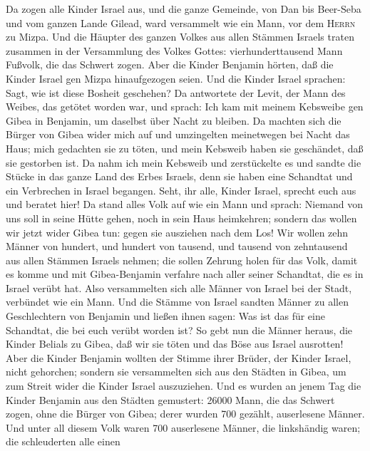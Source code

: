  Da zogen alle Kinder Israel aus, und die ganze Gemeinde,
von Dan bis Beer-Seba und vom ganzen Lande Gilead, ward versammelt wie
ein Mann, vor dem \textsc{Herrn} zu Mizpa.  Und die
Häupter des ganzen Volkes aus allen Stämmen Israels traten zusammen in
der Versammlung des Volkes Gottes: vierhunderttausend Mann Fußvolk, die
das Schwert zogen.  Aber die Kinder Benjamin hörten, daß
die Kinder Israel gen Mizpa hinaufgezogen seien. Und die Kinder Israel
sprachen: Sagt, wie ist diese Bosheit geschehen?  Da
antwortete der Levit, der Mann des Weibes, das getötet worden war, und
sprach: Ich kam mit meinem Kebsweibe gen Gibea in Benjamin, um daselbst
über Nacht zu bleiben.  Da machten sich die Bürger von
Gibea wider mich auf und umzingelten meinetwegen bei Nacht das Haus;
mich gedachten sie zu töten, und mein Kebsweib haben sie geschändet, daß
sie gestorben ist.  Da nahm ich mein Kebsweib und
zerstückelte es und sandte die Stücke in das ganze Land des Erbes
Israels, denn sie haben eine Schandtat und ein Verbrechen in Israel
begangen.  Seht, ihr alle, Kinder Israel, sprecht euch aus
und beratet hier!  Da stand alles Volk auf wie ein Mann
und sprach: Niemand von uns soll in seine Hütte gehen, noch in sein Haus
heimkehren;  sondern das wollen wir jetzt wider Gibea tun:
gegen sie ausziehen nach dem Los!  Wir wollen zehn Männer
von hundert, und hundert von tausend, und tausend von zehntausend aus
allen Stämmen Israels nehmen; die sollen Zehrung holen für das Volk,
damit es komme und mit Gibea-Benjamin verfahre nach aller seiner
Schandtat, die es in Israel verübt hat.  Also
versammelten sich alle Männer von Israel bei der Stadt, verbündet wie
ein Mann.  Und die Stämme von Israel sandten Männer zu
allen Geschlechtern von Benjamin und ließen ihnen sagen: Was ist das für
eine Schandtat, die bei euch verübt worden ist?  So gebt
nun die Männer heraus, die Kinder Belials zu Gibea, daß wir sie töten
und das Böse aus Israel ausrotten! Aber die Kinder Benjamin wollten der
Stimme ihrer Brüder, der Kinder Israel, nicht gehorchen; 
sondern sie versammelten sich aus den Städten in Gibea, um zum Streit
wider die Kinder Israel auszuziehen.  Und es wurden an
jenem Tag die Kinder Benjamin aus den Städten gemustert: 26000 Mann, die
das Schwert zogen, ohne die Bürger von Gibea; derer wurden 700 gezählt,
auserlesene Männer.  Und unter all diesem Volk waren 700
auserlesene Männer, die linkshändig waren; die schleuderten alle einen

